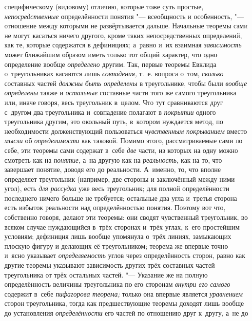 специфическому (видовому) отличию, которые тоже суть простые,
{\em непосредственные}
определённости понятия "--- всеобщность и
особенность, "--- отношение между которыми не развёртывается
дальше. Начальные теоремы сами не могут касаться ничего другого, кроме
таких непосредственных определений, как те, которые содержатся в
дефинициях; а~равно и~их взаимная
{\em зависимость} может
ближайшим образом иметь только тот общий характер, что одно определение
вообще {\em определено}
другим. Так, первые теоремы Евклида о~треугольниках касаются
лишь {\em совпадения,}
т.~е. вопроса о~том,
{\em сколько} составных
частей {\em должны быть определены}
в треугольнике, чтобы были
{\em вообще определены}
также и {\em остальные}
составные части того же самого треугольника или, иначе
говоря, весь треугольник в~целом. Что тут сравниваются друг с~другом два
треугольника и~совпадение полагают в
{\em покрытии} одного
треугольника другим, это окольный путь, в~котором нуждается метод, по
необходимости долженствующий пользоваться
{\em чувственным покрыванием}
вместо {\em мысли}
об {\em определимости}
как таковой. Помимо этого, рассматриваемые сами по себе, эти
теоремы сами содержат в~себе {\em две}
части, из которых на одну можно смотреть как на
{\em понятие,} а~на
другую как на {\em реальность,}
как на то, что завершает понятие, доводя его до реальности.
А~именно, то, что вполне определяет треугольник (например, две стороны и
заключённый между ними угол), есть
{\em для рассудка} уже
весь треугольник; для полной определённости последнего ничего больше не
требуется; остальные два угла и~третья сторона есть избыток реальности над
определённостью понятия. Поэтому вот что, собственно говоря,
делают эти теоремы: они сводят чувственный треугольник, во всяком случае
нуждающийся в~трёх сторонах и~трёх углах, к~его простейшим условиям;
дефиниция лишь вообще упомянула о~трёх линиях, замыкающих плоскую фигуру и
делающих её треугольником; теорема же впервые точно и~ясно указывает
{\em определяемость}
углов через определённость сторон, равно как другие теоремы
указывают зависимость других трёх составных частей треугольника от трёх
остальных частей. "--- Указание же на полную определённость
величины треугольника по его сторонам
{\em внутри его самого}
содержит в~себе
{\em пифагорова теорема;}
только она впервые является
{\em уравнением} сторон
треугольника, тогда как предшествующие
теоремы
доходят лишь вообще до установления
{\em определённости} его
частей по отношению друг к~другу, а~не до
